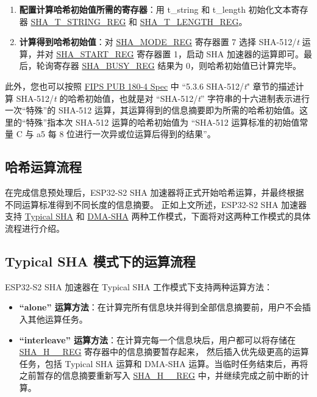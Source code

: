 \documentclass[main\_\_CN.tex]{subfiles}
\begin{document}
\begin{enumerate}
\begin{itemize}
    \end{itemize}
    \item \textbf{配置计算哈希初始值所需的寄存器}：用 t\_string 和 t\_length 初始化文本寄存器 \hyperref[regdesc:SHATSTRINGREG]{SHA\_T\_STRING\_REG} 和 \hyperref[regdesc:SHATLENGTHREG]{SHA\_T\_LENGTH\_REG}。

    \item \textbf{计算得到哈希初始值}：对 \hyperref[regdesc:SHAMODEREG]{SHA\_MODE\_REG} 寄存器置 7 选择 SHA-512/{\it{t}} 运算，并对 \hyperref[regdesc:SHASTARTREG]{SHA\_START\_REG} 寄存器置 1，启动 SHA 加速器的运算即可。最后，轮询寄存器 \hyperref[regdesc:SHABUSYREG]{SHA\_BUSY\_REG} 结果为 0，则哈希初始值已计算完毕。
\end{enumerate}


此外，您也可以按照 \href{https://doi.org/10.6028/NIST.FIPS.180-4}{FIPS PUB 180-4 Spec} 中 ``5.3.6 SHA-512/{\it{t}}" 章节的描述计算 SHA-512/{\it{t}} 的哈希初始值，也就是对 “SHA-512/{\it{t}}” 字符串的十六进制表示进行一次“特殊”的 SHA-512 运算，其运算得到的信息摘要即为所需的哈希初始值。这里的“特殊”指本次 SHA-512 运算的哈希初始值为 “SHA-512 运算标准的初始值常量 C 与 \hexprefix{}a5 每 8 位进行一次异或位运算后得到的结果”。











\subsection{哈希运算流程}\label{hashoperation}

在完成信息预处理后，ESP32-S2 SHA 加速器将正式开始哈希运算，并最终根据不同运算标准得到不同长度的信息摘要。
正如上文所述，ESP32-S2 SHA 加速器支持 \hyperref[subsection:typicalsha]{Typical SHA} 和 \hyperref[subsection:dma-sha]{DMA-SHA} 两种工作模式，下面将对这两种工作模式的具体流程进行介绍。

\subsection{Typical SHA 模式下的运算流程}\label{subsection:typicalsha}

ESP32-S2 SHA 加速器在 Typical SHA 工作模式下支持两种运算方法：

\begin{itemize}
    \item \textbf{“alone” 运算方法}：在计算完所有信息块并得到全部信息摘要前，用户不会插入其他运算任务。
    \item \textbf{“interleave” 运算方法}：在计算完每一个信息块后，用户都可以将存储在 \hyperref[regdesc:SHAHNREG]{SHA\_H\_\_REG} 寄存器中的信息摘要暂存起来， 然后插入优先级更高的运算任务，包括 Typical SHA 运算和 DMA-SHA 运算。当临时任务结束后，再将之前暂存的信息摘要重新写入 \hyperref[regdesc:SHAHNREG]{SHA\_H\_\_REG} 中，并继续完成之前中断的计算。
\end{itemize}
\end{document}
